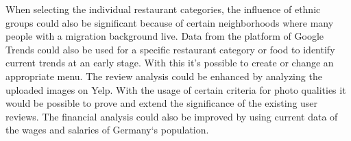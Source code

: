When selecting the individual restaurant categories, the influence of ethnic groups could also be significant because of certain neighborhoods where many people with a migration background live. Data from the platform of Google Trends could also be used for a specific restaurant category or food to identify current trends at an early stage. With this it's possible to create or change an appropriate menu. \newline
The review analysis could be enhanced by analyzing the uploaded images on Yelp. With the usage of certain criteria for photo qualities it would be possible to prove and extend the significance of the existing user reviews. The financial analysis could also be improved by using current data of the wages and salaries of Germany‘s population.
